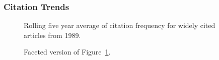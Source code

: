 \documentclass[
  10pt,
  letterpaper,
  DIV=11,
  numbers=noendperiod,
  twoside]{scrartcl}
\begin{document}
\subsubsection*{Citation Trends}\label{citation-trends-13}

\begin{figure}


\caption{\label{fig-citation-spaghetti-1989}Rolling five year average of
citation frequency for widely cited articles from 1989.}

\end{figure}%

\begin{figure}


\caption{\label{fig-citation-facet-1989}Faceted version of
Figure~\ref{fig-citation-spaghetti-1989}.}

\end{figure}%
\end{document}
